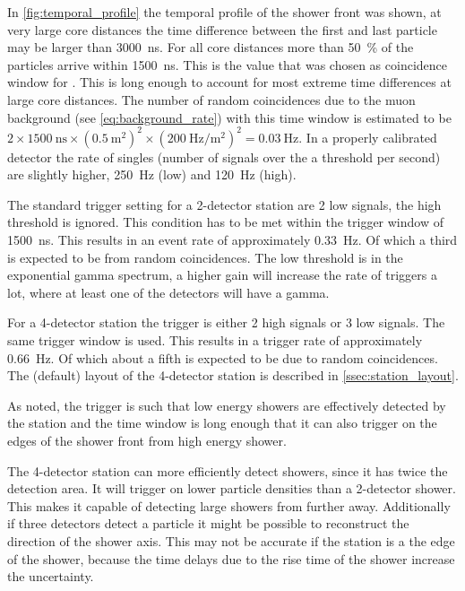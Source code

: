 In \cref{fig:temporal_profile} the temporal profile of the shower front was shown, at very large core distances the time difference between the first and last particle may be larger than \SI{3000}{\ns}. For all core distances more than \SI{50}{\percent} of the particles arrive within \SI{1500}{\ns}. This is the value that was chosen as coincidence window for \hisparc. This is long enough to account for most extreme time differences at large core distances. The number of random coincidences due to the muon background (see \cref{eq:background_rate}) with this time window is estimated to be $2 \times \SI{1500}{\ns} \times \left(\SI{0.5}{\meter\squared}\right)^2 \times \left(\SI{200}{\hertz\per\meter\squared}\right)^2 = \SI{0.03}{\hertz}$. In a properly calibrated detector the rate of singles (number of signals over the a threshold per second) are slightly higher, \SI{250}{\hertz} (low) and \SI{120}{\hertz} (high).

The standard trigger setting for a 2-detector station are 2 low signals, the high threshold is ignored. This condition has to be met within the trigger window of \SI{1500}{\ns}. This results in an event rate of approximately \SI{0.33}{\hertz}. Of which a third is expected to be from random coincidences. The low threshold is in the exponential gamma spectrum, a higher \pmt gain will increase the rate of triggers a lot, where at least one of the detectors will have a gamma.

For a 4-detector station the trigger is either 2 high signals or 3 low signals. The same trigger window is used. This results in a trigger rate of approximately \SI{0.66}{\hertz}. Of which about a fifth is expected to be due to random coincidences. The (default) layout of the 4-detector station is described in \cref{ssec:station_layout}.

As noted, the trigger is such that low energy showers are effectively detected by the station and the time window is long enough that it can also trigger on the edges of the shower front from high energy shower.

The 4-detector station can more efficiently detect showers, since it has twice the detection area. It will trigger on lower particle densities than a 2-detector shower. This makes it capable of detecting large showers from further away. Additionally if three detectors detect a particle it might be possible to reconstruct the direction of the shower axis. This may not be accurate if the station is a the edge of the shower, because the time delays due to the rise time of the shower increase the uncertainty.

